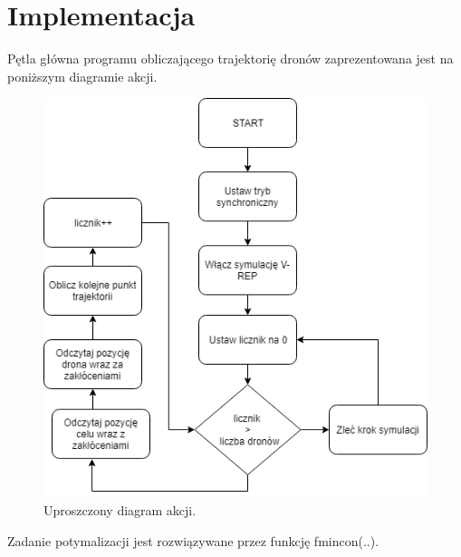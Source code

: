 \documentclass[a4paper, 11pt, oneside]{article}
\begin{document}
\section{Implementacja}
Pętla główna programu obliczającego trajektorię dronów zaprezentowana jest na poniższym diagramie akcji.
\begin{figure}[H]
\centering
\includegraphics[scale=0.5]{uproszczony_digram_akcji.png}
\caption{Uproszczony diagram akcji.}

\end{figure}
Zadanie potymalizacji jest rozwiązywane przez funkcję fmincon(..).
\end{document}
